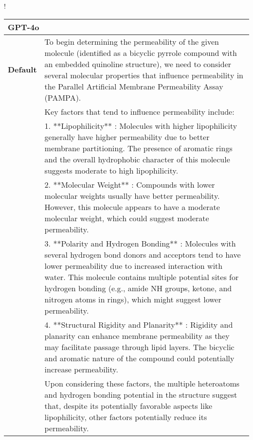 
\begin{table}[ht!]
\begin{resizebox}{\linewidth}{!}{
\centering
\renewcommand{\arraystretch}{1.1}
\begin{tabular}{p{1.2cm} p{18cm}}
\toprule
\multicolumn{2}{l}{\large \textbf{GPT-4o}}  \\
\midrule

\textbf{Default} & To begin determining the permeability of the given molecule (identified as a bicyclic pyrrole compound with an embedded quinoline structure), we need to consider several molecular properties that influence permeability in the Parallel Artificial Membrane Permeability Assay (PAMPA). \\

& Key factors that tend to influence permeability include:\\

& 1. \textcolor{tabblue}{**Lipophilicity**} : Molecules with higher lipophilicity generally have higher permeability due to better membrane partitioning. The presence of aromatic rings and the overall hydrophobic character of this molecule suggests moderate to high lipophilicity.\\

& 2. \textcolor{tabblue}{**Molecular Weight**} : Compounds with lower molecular weights usually have better permeability. However, this molecule appears to have a moderate molecular weight, which could suggest moderate permeability. \\

& 3. \textcolor{tabblue}{**Polarity and Hydrogen Bonding**} : Molecules with several hydrogen bond donors and acceptors tend to have lower permeability due to increased interaction with water. This molecule contains multiple potential sites for hydrogen bonding (e.g., amide NH groups, ketone, and nitrogen atoms in rings), which might suggest lower permeability. \\

& 4. \textcolor{tabblue}{**Structural Rigidity and Planarity**} : Rigidity and planarity can enhance membrane permeability as they may facilitate passage through lipid layers. The bicyclic and aromatic nature of the compound could potentially increase permeability. \\

& Upon considering these factors, the multiple heteroatoms and hydrogen bonding potential in the structure suggest that, despite its potentially favorable aspects like lipophilicity, other factors potentially reduce its permeability. \\


\end{tabular}}
\end{resizebox}
\end{table}
